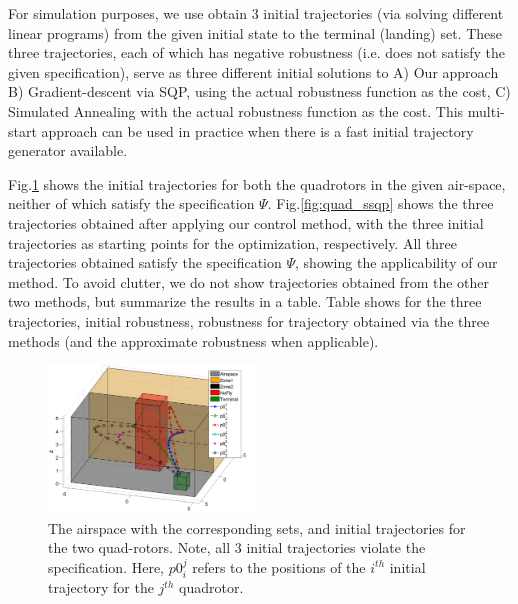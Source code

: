 For simulation purposes, we use obtain 3 initial trajectories (via solving different linear programs) from the given initial state to the terminal (landing) set. These three trajectories, each of which has negative robustness (i.e. does not satisfy the given specification), serve as three different initial solutions to A) Our approach B) Gradient-descent via SQP, using the actual robustness function as the cost, C) Simulated Annealing with the actual robustness function as the cost. This multi-start approach can be used in practice when there is a fast initial trajectory generator available.

Fig.\ref{fig:quad_init} shows the initial trajectories for both the quadrotors in the given air-space, neither of which satisfy the specification $\Psi$. Fig.\ref{fig:quad_ssqp} shows the three trajectories obtained after applying our control method, with the three initial trajectories as starting points for the optimization, respectively. All three trajectories obtained satisfy the specification $\Psi$, showing the applicability of our method. To avoid clutter, we do not show trajectories obtained from the other two methods, but summarize the results in a table. Table shows for the three trajectories, initial robustness, robustness for trajectory obtained via the three methods (and the approximate robustness when applicable).

\begin{figure}[t]
\centering
\includegraphics[width=0.49\textwidth]{figures/QuadInitTrajs_scissored}
\caption{The airspace with the corresponding sets, and initial trajectories for the two quad-rotors. Note, all 3 initial trajectories violate the specification. Here, $p0_{i}^j$ refers to the positions of the $i^{th}$ initial trajectory for the $j^{th}$ quadrotor.}
\label{fig:quad_init}
\end{figure}


